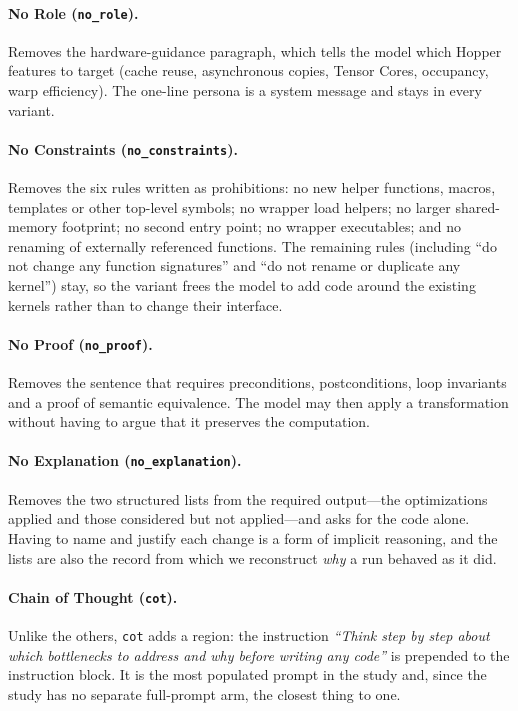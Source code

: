\paragraph{No Role (\texttt{no\_role}).}
Removes the hardware-guidance paragraph, which tells the model which Hopper features to target (cache
reuse, asynchronous copies, Tensor Cores, occupancy, warp efficiency). The one-line persona is a system
message and stays in every variant.

\paragraph{No Constraints (\texttt{no\_constraints}).}
Removes the six rules written as prohibitions: no new helper functions, macros, templates or other
top-level symbols; no wrapper load helpers; no larger shared-memory footprint; no second entry point;
no wrapper executables; and no renaming of externally referenced functions. The remaining rules
(including ``do not change any function signatures'' and ``do not rename or duplicate any kernel'')
stay, so the variant frees the model to add code around the existing kernels rather than to change
their interface.

\paragraph{No Proof (\texttt{no\_proof}).}
Removes the sentence that requires preconditions, postconditions, loop invariants and a proof of
semantic equivalence. The model may then apply a transformation without having to argue that it
preserves the computation.

\paragraph{No Explanation (\texttt{no\_explanation}).}
Removes the two structured lists from the required output---the optimizations applied and those
considered but not applied---and asks for the code alone. Having to name and justify each change is a
form of implicit reasoning, and the lists are also the record from which we reconstruct \emph{why} a
run behaved as it did.

\paragraph{Chain of Thought (\texttt{cot}).}
Unlike the others, \texttt{cot} adds a region: the instruction \textit{``Think step by step about which
bottlenecks to address and why before writing any code''} is prepended to the instruction block. It is
the most populated prompt in the study and, since the study has no separate full-prompt arm, the
closest thing to one.


